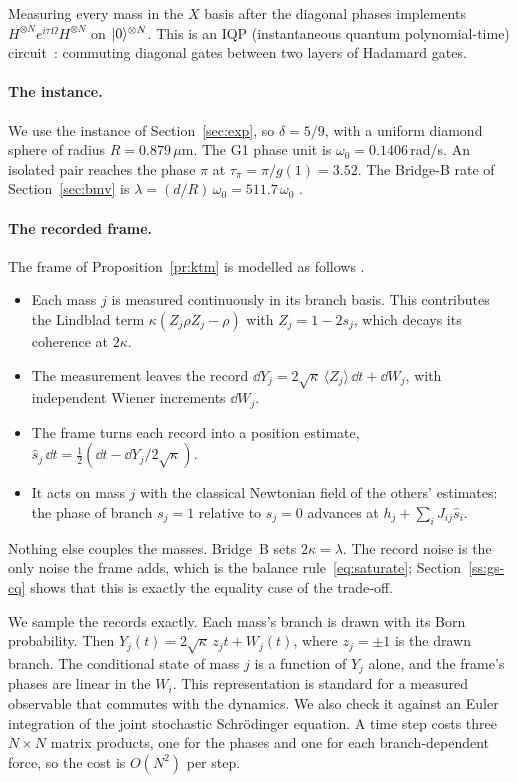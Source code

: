 Measuring every mass in the $X$ basis after the diagonal phases implements $H^{\otimes N}e^{i\tau\Omega}H^{\otimes N}$ on
$\lvert 0\rangle^{\otimes N}$. This is an IQP (instantaneous quantum polynomial-time) circuit~\cite{bremner2011}: commuting diagonal gates between two
layers of Hadamard gates.

\paragraph{The instance.} We use the instance of Section~\ref{sec:exp}, so $\delta=5/9$, with a uniform diamond sphere of radius
$R=0.879\,\mu$m. The G1 phase unit is $\omega_0=0.1406$\,rad/s. An isolated pair reaches the phase $\pi$ at $\tau_\pi=\pi/g(1)=3.52$. The
Bridge-B rate of Section~\ref{sec:bmv} is $\lambda=(d/R)\,\omega_0=511.7\,\omega_0$ .

\paragraph{The recorded frame.} The frame of Proposition~\ref{pr:ktm} is modelled as follows \tagH.
\begin{itemize}[nosep]
\item Each mass $j$ is measured continuously in its branch basis. This contributes the Lindblad term $\kappa(Z_j\rho Z_j-\rho)$ with
$Z_j=1-2s_j$, which decays its coherence at $2\kappa$.
\item The measurement leaves the record $\dd Y_j=2\sqrt\kappa\,\langle Z_j\rangle\,\dd t+\dd W_j$, with independent Wiener increments
$\dd W_j$.
\item The frame turns each record into a position estimate, $\hat s_j\,\dd t=\tfrac12(\dd t-\dd Y_j/2\sqrt\kappa)$.
\item It acts on mass $j$ with the classical Newtonian field of the others' estimates: the phase of branch $s_j=1$ relative to $s_j=0$
advances at $h_j+\sum_iJ_{ij}\hat s_i$.
\end{itemize}
Nothing else couples the masses. Bridge~B sets $2\kappa=\lambda$. The record noise is the only noise the frame adds, which is the balance
rule~\eqref{eq:saturate}; Section~\ref{ss:gs-cq} shows that this is exactly the equality case of the trade-off.

We sample the records exactly. Each mass's branch is drawn with its Born probability. Then $Y_j(t)=2\sqrt\kappa\,z_jt+W_j(t)$, where
$z_j=\pm1$ is the drawn branch. The conditional state of mass $j$ is a function of $Y_j$ alone, and the frame's phases are linear in the
$W_i$. This representation is standard for a measured observable that commutes with the dynamics. We also check it against an Euler
integration of the joint stochastic Schr\"odinger equation. A time step costs three $N\times N$ matrix products, one for the phases and one
for each branch-dependent force, so the cost is $O(N^2)$ per step.


